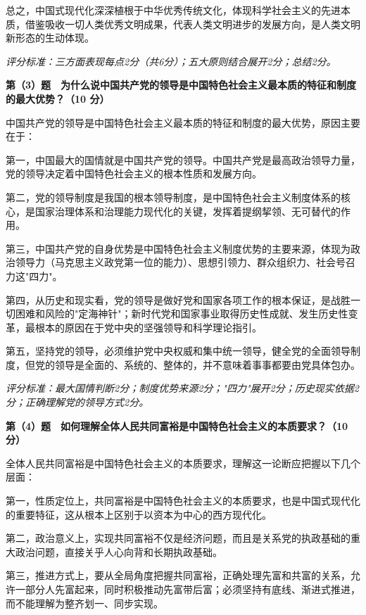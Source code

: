 \documentclass[12pt, a4paper]{article}
\begin{document}
\begin{answerbox}
总之，中国式现代化深深植根于中华优秀传统文化，体现科学社会主义的先进本质，借鉴吸收一切人类优秀文明成果，代表人类文明进步的发展方向，是人类文明新形态的生动体现。

\textit{评分标准：三方面表现每点2分（共6分）；五大原则结合展开2分；总结2分。}

\vspace{6pt}
\textbf{第（3）题　为什么说中国共产党的领导是中国特色社会主义最本质的特征和制度的最大优势？（10 分）}

中国共产党的领导是中国特色社会主义最本质的特征和制度的最大优势，原因主要在于：

第一，中国最大的国情就是中国共产党的领导。中国共产党是最高政治领导力量，党的领导决定着中国特色社会主义的根本性质和发展方向。

第二，党的领导制度是我国的根本领导制度，是中国特色社会主义制度体系的核心，是国家治理体系和治理能力现代化的关键，发挥着提纲挈领、无可替代的作用。

第三，中国共产党的自身优势是中国特色社会主义制度优势的主要来源，体现为政治领导力（马克思主义政党第一位的能力）、思想引领力、群众组织力、社会号召力这"四力"。

第四，从历史和现实看，党的领导是做好党和国家各项工作的根本保证，是战胜一切困难和风险的"定海神针"；新时代党和国家事业取得历史性成就、发生历史性变革，最根本的原因在于党中央的坚强领导和科学理论指引。

第五，坚持党的领导，必须维护党中央权威和集中统一领导，健全党的全面领导制度，但党的领导是全面的、系统的、整体的，并不意味着事事都要由党具体包办。

\textit{评分标准：最大国情判断2分；制度优势来源2分；"四力"展开2分；历史现实依据2分；正确理解党的领导方式2分。}

\vspace{6pt}
\textbf{第（4）题　如何理解全体人民共同富裕是中国特色社会主义的本质要求？（10 分）}

全体人民共同富裕是中国特色社会主义的本质要求，理解这一论断应把握以下几个层面：

第一，性质定位上，共同富裕是中国特色社会主义的本质要求，也是中国式现代化的重要特征，这从根本上区别于以资本为中心的西方现代化。

第二，政治意义上，实现共同富裕不仅是经济问题，而且是关系党的执政基础的重大政治问题，直接关乎人心向背和长期执政基础。

第三，推进方式上，要从全局角度把握共同富裕，正确处理先富和共富的关系，允许一部分人先富起来，同时积极推动先富带后富；必须坚持有底线、渐进式推进，而不能理解为整齐划一、同步实现。


\end{answerbox}
\end{document}
